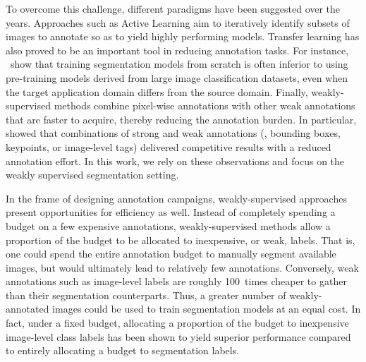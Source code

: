 
To overcome this challenge, different paradigms have been suggested over the years. Approaches such as Active Learning aim to iteratively identify subsets of images to annotate so as to yield highly performing models. Transfer learning has also proved to be an important tool in reducing annotation tasks. For instance, ~show that training segmentation models from scratch is often inferior to using pre-training models derived from large image classification datasets, even when the target application domain differs from the source domain. Finally, weakly-supervised methods combine pixel-wise annotations with other weak annotations that are faster to acquire, thereby reducing the annotation burden. In particular,  showed that combinations of strong and weak annotations (\eg, bounding boxes, keypoints, or image-level tags) delivered competitive results with a reduced annotation effort. In this work, we rely on these observations and focus on the weakly supervised segmentation setting.


In the frame of designing annotation campaigns, weakly-supervised approaches present opportunities for efficiency as well. Instead of completely spending a budget on a few expensive annotations, weakly-supervised methods allow a proportion of the budget to be allocated to inexpensive, or weak, labels. That is, one could spend the entire annotation budget to manually segment available images, but would ultimately lead to relatively few annotations. Conversely, weak annotations such as image-level labels are roughly 100~times cheaper to gather than their segmentation counterparts. Thus, a greater number of weakly-annotated images could be used to train segmentation models at an equal cost. In fact, under a fixed budget, allocating a proportion of the budget to inexpensive image-level class labels has been shown to yield superior performance compared to entirely allocating a budget to segmentation labels.

